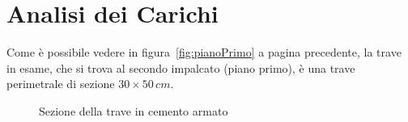 \section{Analisi dei Carichi}\label{sec:loads}
Come è possibile vedere in figura~\ref{fig:pianoPrimo} a pagina precedente, la trave in esame, che si trova al secondo impalcato (piano primo), è una trave perimetrale di sezione $30\times 50\,\si{cm}$.

\begin{figure}
 \centering
 \caption{Sezione della trave in cemento armato}
 \label{fig:beamSec}
\end{figure}

